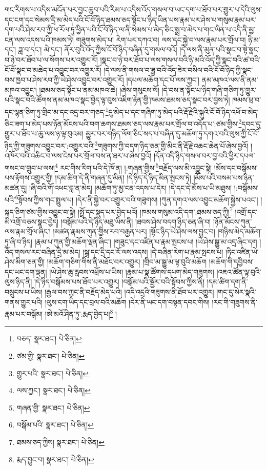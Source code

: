 གང་རིགས་པ་འདིས་མངོན་པར་བྱང་ཆུབ་པའི་རིམ་པ་འདིས་འོད་གསལ་བ་ཡང་དག་པ་ཐོབ་པར་གྱུར་པ་དེའི་ལུས་དང་ངག་དང་སེམས་དྲི་མ་མེད་པའི་ངོ་བོ་ཉིད་ཐམས་ཅད་སྟོང་པ་ཉིད་ཡིན་པས་རྣམ་པར་ཤེས་པ་གསུམ་རྣམ་པར་དག་པའི་ཤེས་རབ་ཀྱི་ཕ་རོལ་ཏུ་ཕྱིན་པའི་ངོ་བོ་ཉིད་ལ་ནི་སེམས་པ་མེད་ཅིང་སྨྲ་བ་མེད་པ་གང་ཡིན་པ་འདི་ནི་མྱ་ངན་ལས་འདས་པའི་ཁམས་ཏེ། གཟུགས་མེད་པ། རེག་པར་དཀའ་བ། ལས་དང་སྐྱེ་བ་ལས་རྣམ་པར་གྲོལ་བ། ཉི་མ་དང་། ཟླ་བ་དང་། མེ་དང་། ནོར་བུའི་འོད་ཀྱིས་ངོ་བོ་ཉིད་བཞིན་དུ་གསལ་བའོ། །དེ་ལས་ནི་མུན་པའི་སྣང་བ་སྟེ་སྣང་བ་ཉེ་བར་ཐོབ་པ་ལ་སོགས་པར་འགྱུར་རོ། །སྣང་བ་ཉེ་བར་ཐོབ་པ་ལས་གསལ་བའི་ཉི་མའི་འོད་ཀྱི་སྣང་བའི་ཚ་བའི་ངོ་བོ་སྣང་བ་མཆེད་པ་འབྱུང་བར་འགྱུར་རོ། །དེ་ལས་ནི་གསལ་བ་ཟླ་བའི་འོད་ཟེར་བསིལ་བའི་ངོ་བོ་ཉིད་ཀྱི་སྣང་བས་ཁྱབ་པ་ཤེས་རབ་ཀྱི་ཡེ་ཤེས་འབྱུང་བར་འགྱུར་རོ། །དཔལ་མཆོག་དང་པོ་ལས་ཀྱང་། ནམ་མཁའ་ལས་ནི་ནམ་མཁའ་འབྱུང་། །ཐམས་ཅད་སྟོང་པ་ནམ་མཁའ་ཆེ། །ཞེས་གསུངས་སོ། །དེ་བས་ན་སྟོང་པ་ཉིད་གཞི་གཅིག་ཏུ་གྱུར་པའི་སྣང་བའི་ཚོགས་ནམ་མཁའ་སྣང་བྱེད་ལྟ་བུས་འཇིག་རྟེན་གྱི་ཁམས་ཐམས་ཅད་སྣང་བར་བྱས་ཏེ། ཁམས་ཕྲ་བ་དང་ལྷན་ཅིག་ཏུ་གྲིབ་མ་དང་འདྲ་བར་གཅད་\footnote{བཅད་  སྣར་ཐང་།  པེ་ཅིན། }དུ་མེད་པ་དང་གཞིག་ཏུ་མེད་པའི་རྡོ་རྗེའི་སྐུའི་ངོ་བོ་ཉིད་འཕོ་བ་མེད་ཅིང་ཟག་པ་མེད་པས་ཉོན་མོངས་པའི་བག་ཆགས་ཐམས་ཅད་ལས་རྣམ་པར་གྲོལ་བ་འདོད་པ་:ཙམ་གྱིས་\footnote{ཙམ་གྱི་  སྣར་ཐང་།  པེ་ཅིན། }དབང་དུ་གྱུར་པ་ཐོབ་པ་ཆུ་ལས་ཉ་ལྟ་བུའམ། མྱུར་བར་གཉིད་ལོག་ཅིང་སད་པ་བཞིན་དུ་མཆོག་ཏུ་དགའ་བའི་ལུས་ཀྱི་ངོ་བོ་ཉིད་ཀྱི་གཟུགས་འབྱུང་བར་:འགྱུར་བའི་\footnote{གྱུར་པའི་  སྣར་ཐང་།  པེ་ཅིན། }གཟུགས་ཀྱི་བདག་ཉིད་ཅན་གྱི་མིང་ནི་རྡོ་རྗེ་འཆང་ཆེན་པོ་ཞེས་བྱའོ། །འཁོར་བའི་འཆིང་བ་ལས་ངེས་པར་གྲོལ་བས་ན་ཐར་པ་ཞེས་བྱའོ། །དོན་འདི་ཉིད་གསལ་བར་བྱ་བའི་ཕྱིར་དཔལ་གསང་བ་གྲུབ་པ་ལས།\footnote{ལས་ཀྱང་།  སྣར་ཐང་།  པེ་ཅིན། } རང་གིས་རིག་པའི་དེ་ཁོ་ན། །:གཞན་གྱིས་\footnote{གཞན་གྱི་  སྣར་ཐང་།  པེ་ཅིན། }བརྗོད་ལས་མི་འབྱུང་སྟེ། །མོས་དང་བསྒོམས་པས་རྟོགས་འགྱུར་གྱི། །དམ་ཚིག་དེ་ནི་གཞན་དུ་མིན། །དེ་ཉིད་དེ་ཉིད་མིན་སྤངས་ཏེ། །མོས་པའི་བསམ་པས་ཉིན་མཚན་དུ། །ཞི་བའི་གོ་འཕང་བླ་ན་མེད། །མཆོག་ཏུ་མྱ་ངན་འདས་པ་དེར། །དེ་དང་དེ་མོས་པ་ཡི་མཐུས། །:བསྒོམས་པའི་\footnote{བསྒོམ་པའི་  སྣར་ཐང་།  པེ་ཅིན། }སྟོབས་ཀྱིས་གང་སྤྲུལ་པ། །དེར་ནི་སྐྱེ་བར་འགྱུར་བའི་གཟུགས། །ཀུན་དགའ་ལས་འབྱུང་མཆོག་སྐྱེས་པའང་། །སྐད་ཅིག་ཙམ་གྱིས་འབྱུང་བ་སྟེ། །སྤྲོ་དང་སྡུད་པར་བྱེད་པའོ། །ཁམས་གསུམ་འདི་དག་:ཐམས་ཅད་ཀྱི།\footnote{ཐམས་ཅད་ཀྱིས།  སྣར་ཐང་།  པེ་ཅིན། } །འགྲོ་དང་མི་འགྲོ་བཅས་སྣང་བྱེད། །བསྒོམ་པའི་དེ་ཉིད་མཐུ་ཡིས་ནི། །ཐབས་ཤེས་བདག་ཉིད་ཅན་ཞི་བ། །ཉོན་མོངས་ཀུན་ལས་རྣམ་གྲོལ་ཞིང་། །མཚན་རྣམས་ཀུན་གྱིས་རབ་བརྒྱན་པར། །སྟོང་ཉིད་ཡེ་ཤེས་ལས་བྱུང་བ། །གཉིས་མེད་མཆོག་ཏུ་ཞི་བ་ཉིད། །རྣམ་པ་ཀུན་གྱི་མཆོག་ལྡན་ཞིང་། །གཟུང་དང་འཛིན་པ་རྣམ་སྤངས་པ། །ཡེ་ཤེས་སྒྱུ་མ་འདྲ་ཞིང་དག །འོད་གསལ་རང་བཞིན་དྲི་མ་མེད། །སྒྲ་དང་དྲི་དང་རོ་ལས་འདས། །དེ་བཞིན་རེག་པ་རྣམ་སྤངས་པ། །ཏིང་འཛིན་ཡེ་ཤེས་མིག་ཅན་གྱི། །མཆོག་གཅིག་གིས་ནི་མཐོང་བར་འགྱུར། །གྲིབ་མ་སྒྱུ་མ་ལྟ་བུའི་མཆོག །མཆོག་གི་དབྱིབས་དང་ཡང་དག་ལྡན། །ཡེ་ཤེས་ཆུ་རླབས་འཕྲོས་པ་ཡིས། །རྣམ་པ་སྣ་ཚོགས་དཔག་མེད་གཟུགས། །འཇའ་ཚོན་ལྟ་བུའི་ལུས་ཉིད་ནི། །དེ་ཉིད་བསྒོམས་པས་ཐོབ་པར་འགྱུར། །བསྒོམ་པའི་སྦྱོར་བའི་སྟོབས་ཀྱིས་ནི། །དམ་ཚིག་དག་ནི་བསྲུངས་པ་ཡིས། །རྒྱལ་བས་ཀྱང་ནི་བརྗོད་མེད་པའི། །འདི་འདྲའི་གཟུགས་ནི་ཐོབ་པར་འགྱུར། །གང་དུ་སེར་སྣའི་གནས་གྱུར་པའི། །ལུས་ངག་ཡིད་དང་བྲལ་བའི་མཆོག །དེར་ནི་ཡང་དག་བསྟན་དབང་གིས། །རང་གི་གཟུགས་ནི་རྣམ་པར་བསྒོམ། །ཨེ་མའོ་ཤིན་ཏུ་:རྨད་བྱེད་པ།\footnote{རྨད་བྱུང་བ།  སྣར་ཐང་།  པེ་ཅིན། } །
